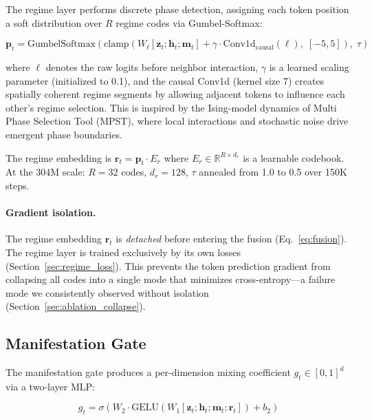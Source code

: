 \documentclass{article}
\begin{document}
The regime layer performs discrete phase detection, assigning each token
position a soft distribution over $R$ regime codes via Gumbel-Softmax:

\begin{equation}
\mathbf{p}_t = \text{GumbelSoftmax}\!\left(
    \text{clamp}\!\left(
        W_\ell [\mathbf{z}_t; \mathbf{h}_t; \mathbf{m}_t] + \gamma \cdot \text{Conv1d}_\text{causal}(\boldsymbol\ell),\;
        [-5, 5]
    \right),\; \tau
\right)
\end{equation}

where $\boldsymbol\ell$ denotes the raw logits before neighbor interaction,
$\gamma$ is a learned scaling parameter (initialized to 0.1), and the causal
Conv1d (kernel size 7) creates spatially coherent regime segments by allowing
adjacent tokens to influence each other's regime selection. This is inspired by
the Ising-model dynamics of Multi Phase Selection Tool (MPST), where
local interactions and stochastic noise drive emergent phase boundaries.

The regime embedding is $\mathbf{r}_t = \mathbf{p}_t \cdot E_r$ where
$E_r \in \mathbb{R}^{R \times d_r}$ is a learnable codebook. At the 304M
scale: $R=32$ codes, $d_r=128$, $\tau$ annealed from 1.0 to 0.5 over 150K
steps.

\paragraph{Gradient isolation.} The regime embedding $\mathbf{r}_t$ is
\emph{detached} before entering the fusion (Eq.~\ref{eq:fusion}). The regime
layer is trained exclusively by its own losses (Section~\ref{sec:regime_loss}).
This prevents the token prediction gradient from collapsing all codes into a
single mode that minimizes cross-entropy---a failure mode we consistently
observed without isolation (Section~\ref{sec:ablation_collapse}).

\subsection{Manifestation Gate}
\label{sec:gate}

The manifestation gate produces a per-dimension mixing coefficient
$g_t \in [0,1]^d$ via a two-layer MLP:

\begin{equation}
g_t = \sigma\!\left(W_2 \cdot \text{GELU}(W_1 [\mathbf{z}_t; \mathbf{h}_t; \mathbf{m}_t; \mathbf{r}_t]) + b_2\right)
\end{equation}
\end{document}
